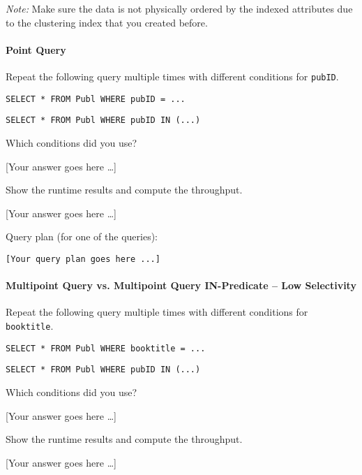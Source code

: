 \documentclass[11pt]{scrartcl}
\newcommand{\youranswerhere}{[Your answer goes here \ldots]}
\begin{document}
\emph{Note:} Make sure the data is not physically ordered by the indexed attributes due to the clustering index that you created before.

\paragraph{Point Query}

Repeat the following query multiple times with different conditions for \texttt{pubID}.

\begin{lstlisting}[style=dbtsql]
SELECT * FROM Publ WHERE pubID = ...
\end{lstlisting}

\begin{lstlisting}[style=dbtsql]
SELECT * FROM Publ WHERE pubID IN (...)
\end{lstlisting}


Which conditions did you use?

\youranswerhere{}

Show the runtime results and compute the throughput.

\youranswerhere{}

Query plan (for one of the queries):

{\small
\parskip0pt\begin{verbatim}
[Your query plan goes here ...]
\end{verbatim}}

\paragraph{Multipoint Query vs. Multipoint Query IN-Predicate -- Low Selectivity}

Repeat the following query multiple times with different conditions for \texttt{booktitle}.

\begin{lstlisting}[style=dbtsql]
SELECT * FROM Publ WHERE booktitle = ...
\end{lstlisting}

\begin{lstlisting}[style=dbtsql]
SELECT * FROM Publ WHERE pubID IN (...)
\end{lstlisting}

Which conditions did you use?

\youranswerhere{}

Show the runtime results and compute the throughput.

\youranswerhere{}
\end{document}
